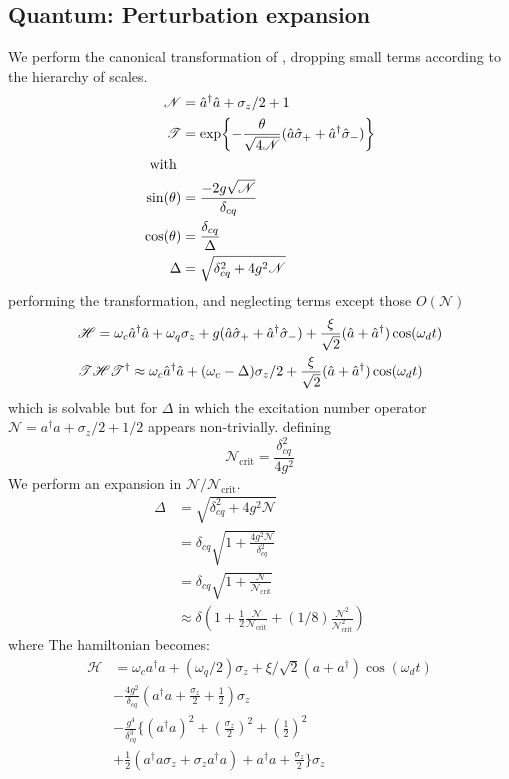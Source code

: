 \subsection{Quantum: Perturbation expansion}
We perform the canonical transformation of \cite{Carbonaro1979}, dropping small terms according to the hierarchy of scales.
\begin{align*}
  \mathscr{N} &= {\hat{a}^\dagger} \hat{a} + \sigma_z/2+ 1\\
  \mathscr{T} &= \exp{-\frac{\theta}{\sqrt{4\mathscr{N}}} (\hat{a}\hat{\sigma}_++ {\hat{a}^\dagger}\hat{\sigma}_-)}\\
  \text{with }&\\
  \sin(\theta) &= \frac{-2g\sqrt{\mathscr{N}}}{\delta_{cq}}\\
  \cos(\theta) &= \frac{\delta_{cq}}{\Delta}\\
  \Delta &= \sqrt{\delta_{cq}^2+4g^2 \mathscr{N}}
\end{align*}
performing the transformation, and neglecting terms except those $O\left(\mathscr{N}\right)$
\begin{align*}
  &\mathscr{H} = \omega_c {\hat{a}^\dagger} \hat{a} + \omega_q \sigma_z + g(\hat{a}\hat{\sigma}_+ + {\hat{a}^\dagger} \hat{\sigma}_-) + \frac{\xi}{\sqrt{2}} (\hat{a} + {\hat{a}^\dagger} ) \cos(\omega_d t) \\
  &\mathscr{T}\mathscr{H}\mathscr{T}^\dagger \approx \omega_c {\hat{a}^\dagger} \hat{a} + ( \omega_c - \Delta ) \sigma_z /2 + \frac{\xi}{\sqrt{2}} (\hat{a} + {\hat{a}^\dagger} ) \cos(\omega_d t)
\end{align*}
which is solvable but for $\Delta$ in which the excitation number operator $\mathscr{N} = a ^ \dagger a + \sigma_z/2 + 1/2$ appears non-trivially. 
defining
\begin{equation}
    \mathscr{N}_{\text{crit}} = \frac{\delta_{cq}^2}{4g^2}
\end{equation}
We perform an expansion in $\mathscr{N}/\mathscr{N}_{\text{crit}}$.
\begin{align}
    \Delta &= \sqrt{\delta_{cq}^2 + 4g^2 \mathscr{N}}\\
           &= \delta_{cq} \sqrt{1 + \frac{4g^2\mathscr{N}}{\delta_{cq}^2}}\\
           &= \delta_{cq} \sqrt{1 + \frac{\mathscr{N}}{\mathscr{N}_{\text{crit}}}}\\
           & \approx \delta \left(
             1
             + \frac{1}{2}\frac{\mathscr{N}}{\mathscr{N}_{\text{crit}}}
             + (1/8) \frac{\mathscr{N}^2}{\mathscr{N}^2_{\text{crit}}}
             \right)
\end{align}
where 
The hamiltonian becomes:
\begin{align}
    \mathscr{H} &= \omega_c a ^ \dagger a
    + (\omega_q/2) \sigma_z
    +  \xi/\sqrt{2} (a + a^\dagger) \cos(\omega_d t)\\
    &- \frac{4g^2}{\delta_{cq}}\left(a^\dagger a 
    +  \frac{\sigma_z}{2} + \frac{1}{2}\right)\sigma_z\\
    &- \frac{g^4}{\delta_{cq}^3}\Big\{
    \left(a^\dagger a\right)^2
    + \left(\frac{\sigma_z}{2}\right)^2
    + \left(\frac{1}{2}\right)^2\\
    &+ \frac{1}{2} \left(
                    a^\dagger a \sigma_z + \sigma_z a^\dagger a
                  \right)
    + a^\dagger a + \frac{\sigma_z}{2}
    \Big\} 
    \sigma_z
\end{align}
